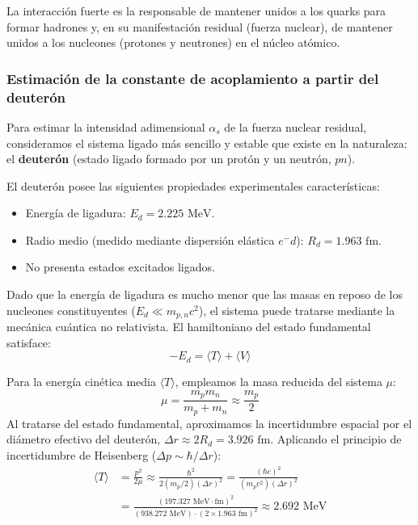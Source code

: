 La interacción fuerte es la responsable de mantener unidos a los quarks para formar hadrones y, en su manifestación residual (fuerza nuclear), de mantener unidos a los nucleones (protones y neutrones) en el núcleo atómico.

\subsubsection*{Estimación de la constante de acoplamiento a partir del deuterón}

Para estimar la intensidad adimensional $\alpha_s$ de la fuerza nuclear residual, consideramos el sistema ligado más sencillo y estable que existe en la naturaleza: el \textbf{deuterón} (estado ligado formado por un protón y un neutrón, $pn$).

El deuterón posee las siguientes propiedades experimentales características:
\begin{itemize}
    \item Energía de ligadura: $E_d = 2.225 \text{ MeV}$.
    \item Radio medio (medido mediante dispersión elástica $e^- d$): $R_d = 1.963 \text{ fm}$.
    \item No presenta estados excitados ligados.
\end{itemize}

Dado que la energía de ligadura es mucho menor que las masas en reposo de los nucleones constituyentes ($E_d \ll m_{p,n} c^2$), el sistema puede tratarse mediante la mecánica cuántica no relativista. El hamiltoniano del estado fundamental satisface:
\begin{equation}
    -E_d = \langle T \rangle + \langle V \rangle
\end{equation}

Para la energía cinética media $\langle T \rangle$, empleamos la masa reducida del sistema $\mu$:
\begin{equation}
    \mu = \frac{m_p m_n}{m_p + m_n} \approx \frac{m_p}{2}
\end{equation}
Al tratarse del estado fundamental, aproximamos la incertidumbre espacial por el diámetro efectivo del deuterón, $\Delta r \approx 2 R_d = 3.926 \text{ fm}$. Aplicando el principio de incertidumbre de Heisenberg ($\Delta p \sim \hbar / \Delta r$):
\begin{align}
    \langle T \rangle &= \frac{p^2}{2\mu} \approx \frac{\hbar^2}{2 (m_p / 2) (\Delta r)^2} = \frac{(\hbar c)^2}{(m_p c^2) (\Delta r)^2} \nonumber \\
    &= \frac{(197.327 \text{ MeV}\cdot\text{fm})^2}{(938.272 \text{ MeV}) \cdot (2 \times 1.963 \text{ fm})^2} \approx 2.692 \text{ MeV}
\end{align}

